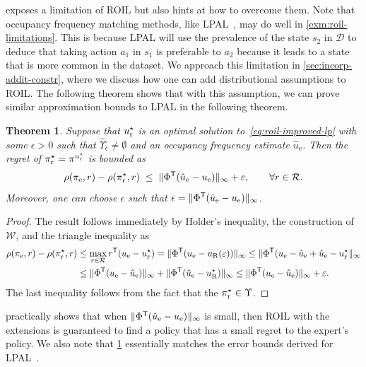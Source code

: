 \documentclass[10pt]{article}
\renewcommand{\cite}{\citep}
\theoremstyle{plain}
\newtheorem{theorem}{Theorem}
\theoremstyle{remark}
\begin{document}
 exposes a limitation of ROIL but also hints at how to overcome them. Note that occupancy frequency matching methods, like LPAL~\cite{Syed2008}, may do well in \cref{exm:roil-limitations}. This is because LPAL will use the prevalence of the state $s_2$ in $\mathcal{D}$ to deduce that taking action $a_1$ in $s_1$ is preferable to $a_2$ because it leads to a state that is more common in the dataset. We approach this limitation in \cref{sec:incorp-addit-constr}, where we discuss how one can add distributional assumptions to ROIL. The following theorem shows that with this assumption, we can prove similar approximation bounds to LPAL in the following theorem. 

\begin{theorem} \label{roilRegretBound}
Suppose that $u_{\mathrm{r}}^{\mathnormal{\star}}$ is an optimal solution to~\eqref{eq:roil-improved-lp} with some $\epsilon>0$ such that $\hat{\Upsilon}_{\epsilon} \neq \emptyset$ and an occupancy frequency estimate $\hat{u}_{\mathrm{e}}$. Then the regret of $\pi_{\mathrm{r}}^{\mathnormal{\star}}  = \pi^{u^{\mathnormal{\star}}_{\mathrm{r}}}$ is bounded as
\[
\rho(\pi_{\mathrm{e}}, r) - \rho(\pi_{\mathrm{r}}^{\mathnormal{\star}}, r)
\;\leq\;
\| \Phi^{\mathsf{T}} (\hat{u}_{\mathrm{e}} - u_{\mathrm{e}}) \|_\infty + \varepsilon,
\qquad \forall r\in \mathcal{R}.
\]
Moreover, one can choose $\epsilon$ such that $ \epsilon = \| \Phi^{\mathsf{T}} (\hat{u}_{\mathrm{e}} - u_{\mathrm{e}}) \|_\infty$.
\end{theorem}
\begin{proof}
The result follows immediately by Holder's inequality, the construction of $\mathcal{W}$, and the triangle inequality as
\begin{align*}
\rho(\pi_{\mathrm{e}}, r) - \rho(\pi_{\mathrm{r}}^{\mathnormal{\star}}, r)
  &\le  \max_{r\in\mathcal{R}} r^{\mathsf{T}}(u_{\mathrm{e}} - u_{\mathrm{r}}^{\mathnormal{\star}})
    = \| \Phi^{\mathsf{T}} (u_{\mathrm{e}} - u_{\mathrm{R}}(\varepsilon)) \|_\infty
    \leq \| \Phi^{\mathsf{T}} (u_{\mathrm{e}} - \hat{u}_{\mathrm{e}} + \hat{u}_{\mathrm{e}} - u_{\mathrm{r}}^{\mathnormal{\star}} \|_\infty \\
&\leq \| \Phi^{\mathsf{T}} (u_{\mathrm{e}}-\hat{u}_{\mathrm{e}}) \|_\infty + \| \Phi^{\mathsf{T}} (\hat{u}_{\mathrm{e}} - u_{\mathrm{R}}^{\mathnormal{\star}}) \|_\infty \leq  \| \Phi^{\mathsf{T}} (u_{\mathrm{e}}-\hat{u}_{\mathrm{e}}) \|_\infty + \varepsilon.
\end{align*}
The last inequality follows from the fact that the $\pi_{\mathrm{r}}^{\mathnormal{\star}}  \in \Upsilon$.
\end{proof}

 practically shows that when $\| \Phi^{\mathsf{T}} (\hat{u}_{\mathrm{e}} - u_{\mathrm{e}}) \|_\infty $ is small, then ROIL with the extensions is guaranteed to find a policy that has a small regret to the expert's policy. We also note that \cref{roilRegretBound} essentially matches the error bounds derived for LPAL~\cite{Syed2008}.
\end{document}
